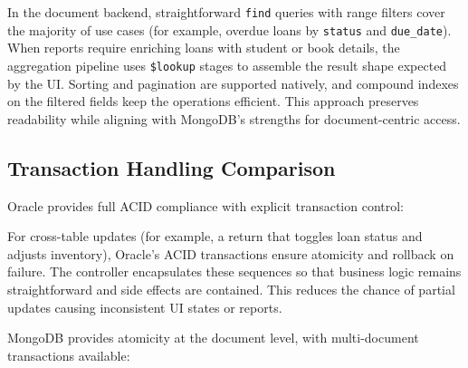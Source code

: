 \documentclass[12pt,a4paper]{article}
\begin{document}
In the document backend, straightforward \texttt{find} queries with range filters cover the majority of use cases (for example, overdue loans by \texttt{status} and \texttt{due\_date}). When reports require enriching loans with student or book details, the aggregation pipeline uses \texttt{\$lookup} stages to assemble the result shape expected by the UI. Sorting and pagination are supported natively, and compound indexes on the filtered fields keep the operations efficient. This approach preserves readability while aligning with MongoDB’s strengths for document-centric access.

\subsection{Transaction Handling Comparison}

Oracle provides full ACID compliance with explicit transaction control:

\begin{comment}
\begin{lstlisting}[language=Java, caption=Oracle Transaction Management]
public boolean returnBook(int loanId) throws SQLException {
    Connection conn = connectionManager.getConnection();
    try {
        conn.setAutoCommit(false);
        
        // Update loan status
        loanDAO.updateLoanStatus(loanId, "RETURNED", LocalDate.now());
        
        // Update book availability
        Loan loan = loanDAO.getLoanById(loanId);
        bookDAO.incrementAvailableCopies(loan.getBookId());
        
        conn.commit();
        return true;
    } catch (SQLException e) {
        conn.rollback();
        throw e;
    } finally {
        conn.setAutoCommit(true);
    }
}
\end{lstlisting}
\end{comment}

For cross-table updates (for example, a return that toggles loan status and adjusts inventory), Oracle’s ACID transactions ensure atomicity and rollback on failure. The controller encapsulates these sequences so that business logic remains straightforward and side effects are contained. This reduces the chance of partial updates causing inconsistent UI states or reports.

MongoDB provides atomicity at the document level, with multi-document transactions available:
\end{document}
